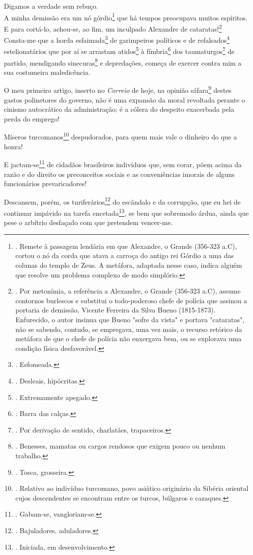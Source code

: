 Digamos a verdade sem rebuço.\\
A minha demissão era um nó górdio\footnote{. Remete à passagem lendária
  em que Alexandre, o Grande (356-323 a.C), cortou o nó da corda que
  atava a carroça do antigo rei Górdio a uma das colunas do templo de
  Zeus. A metáfora, adaptada nesse caso, indica alguém que resolve um
  problema complexo de modo simplório.} que há tempos preocupava muitos
espíritos. E para cortá-lo, achou-se, ao fim, um inculpado Alexandre de
cataratas!\footnote{. Por metonímia, a referência a Alexandre, o Grande
  (356-323 a.C), assume contornos burlescos e substitui o todo-poderoso
  chefe de polícia que assinou a portaria de demissão, Vicente Ferreira
  da Silva Bueno (1815-1873). Enfurecido, o autor insinua que Bueno
  "sofre da vista" e portava "cataratas", não se sabendo, contudo, se
  empregava, uma vez mais, o recurso retórico da metáfora de que o chefe
  de polícia não enxergava bem, ou se explorava uma condição física
  desfavorável.}\\
Consta-me que a horda esfaimada\footnote{. Esfomeada.} de garimpeiros
políticos e de refalsados\footnote{. Desleais, hipócritas.}
estelionatários que por aí se arrastam atidos\footnote{. Extremamente
  apegado.} à fímbria\footnote{. Barra das calças.} dos
taumaturgos\footnote{. Por derivação de sentido, charlatães,
  trapaceiros.} de partido, mendigando sinecuras\footnote{. Benesses,
  mamatas ou cargos rendosos que exigem pouco ou nenhum trabalho.} e
depredações, começa de exercer contra mim a sua costumeira maledicência.

O meu primeiro artigo, inserto no \emph{Correio} de hoje, na opinião
sáfara\footnote{. Tosca, grosseira.} destes gastos polinetores do
governo, não é uma expansão da moral revoltada perante o cinismo
autocrático da administração; é a cólera do despeito exacerbada pela
perda do emprego!

Míseros turcomanos\footnote{. Relativo ao indivíduo turcomano, povo
  asiático originário da Sibéria oriental cujos descendentes se
  encontram entre os turcos, búlgaros e cazaques.} despudorados, para
quem mais vale o dinheiro do que a honra!

E jactam-se\footnote{. Gabam-se, vangloriam-se.} de cidadãos brasileiros
indivíduos que, sem corar, põem acima da razão e do direito os
preconceitos sociais e as conveniências imorais de alguns funcionários
prevaricadores!

Descansem, porém, os turiferários\footnote{. Bajuladores, aduladores.}
do escândalo e da corrupção, que eu hei de continuar impávido na tarefa
encetada\footnote{. Iniciada, em desenvolvimento.}, se bem que sobremodo
árdua, ainda que pese o arbítrio desfaçado com que pretendem vencer-me.

